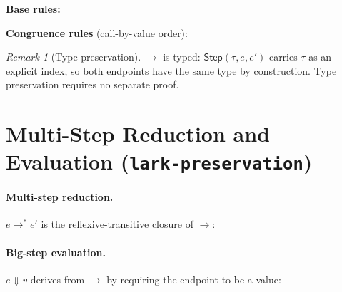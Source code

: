 \documentclass[10pt,a4paper]{article}
\newcommand{\IsVal}[2]{\mathsf{IsVal}(#1,\,#2)} %
\newcommand{\step}{\to}
\newcommand{\steps}{\to^{*}}
\newcommand{\eval}{\Downarrow}
\newcommand{\subst}[2]{#1[#2]}
\newcommand{\envnil}{\langle\,\rangle}
\newcommand{\envcons}[2]{(#1;\,#2)}
\newcommand{\klet}{\mathbf{let}}
\newcommand{\kin}{\mathbf{in}}
\newcommand{\kif}{\mathbf{if}}
\newcommand{\kthen}{\mathbf{then}}
\newcommand{\kelse}{\mathbf{else}}
\newcommand{\lfile}[1]{\texttt{#1}}
\theoremstyle{plain}
\theoremstyle{definition}
\theoremstyle{remark}
\newtheorem{remark}{Remark}
\begin{document}
\medskip
\noindent\textbf{Base rules:}

\noindent\textbf{Congruence rules} (call-by-value order):

\begin{remark}[Type preservation]
$\step$ is typed: $\mathsf{Step}(\tau,e,e')$ carries $\tau$ as an
explicit index, so both endpoints have the same type by construction.
Type preservation requires no separate proof.
\end{remark}

\section{Multi-Step Reduction and Evaluation (\lfile{lark-preservation})}
\label{sec:preservation}

\paragraph{Multi-step reduction.}
$e \steps e'$ is the reflexive-transitive closure of $\step$:

\paragraph{Big-step evaluation.}
$e \eval v$ derives from $\step$ by requiring the endpoint to be a value:
\end{document}
